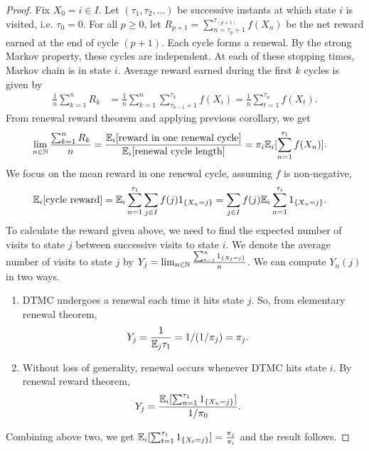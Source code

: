 \documentclass[a4paper,10pt,english]{article}
\begin{document}
\begin{proof}

Fix $X_0 = i \in I$. Let $(\tau_1, \tau_2, \ldots)$ be successive instants at which state $i$ is visited, i.e. $\tau_0 = 0$. 
For all $p \geq 0$,  let $R_{p+1} = \sum_{n = \tau_p + 1}^{\tau_{(p + 1)}} f(X_n)$ be the net reward earned at the end of cycle $(p+1)$. 
Each cycle forms a renewal. 
By the strong Markov property, these cycles are independent. 
At each of these stopping times, Markov chain is in state $i$. 
Average reward earned during the first $k$ cycles is given by
\begin{align*}	
\frac{1}{n} \sum_{k=1}^{n} R_k &= \frac{1}{n} \sum_{k=1}^{n} \sum_{\tau_{k-1} + 1}^{\tau_k} f(X_i)= \frac{1}{n} \sum_{t=1}^{\tau_n} f(X_t).
\end{align*}
From renewal reward theorem and applying previous corollary, we get
\begin{align*}
\lim_{n \in \mathbb{N}}\frac{\sum_{k=1}^nR_k}{n} &= \frac{\mathbb{E}_i[\text{reward in one renewal cycle}]}{\mathbb{E}_i[\text{renewal cycle length}]} = \pi_i\mathbb{E}_i[\sum_{n=1}^{\tau_1}f(X_n)].
\end{align*}
We focus on the mean reward in one renewal cycle, assuming $f$ is non-negative,
\begin{align*}
\mathbb{E}_i[\text{cycle reward}] &= \mathbb{E}_i\sum_{n=1}^{\tau_1} \sum_{j \in I} f(j) 1_{\{X_n = j\}} = \sum_{j \in I} f(j) \mathbb{E}_i\sum_{n=1}^{\tau_i} 1_{\{X_n = j\}}.
\end{align*}
To calculate the reward given above, we need to find the expected number of visits to state $j$ between successive visits to state $i$. 
We denote the average number of visits to state $j$ by  
$Y_j = \lim_{n \in \mathbb{N}}\frac{\sum_{t=1}^{n} 1_{\{X_t = j\}}}{n}$. %
We can compute $Y_n(j)$ in two ways.
\begin{enumerate}
	\item DTMC undergoes a renewal each time it hits state $j$. 
	So, from elementary renewal theorem, 
	\begin{align*}
	Y_j &= \frac{1}{\mathbb{E}_j\tau_1} = 1/(1/\pi_j) = \pi_j.
	\end{align*}
	\item Without loss of generality, renewal occurs whenever DTMC hits state $i$. 
	By renewal reward theorem, 
	\begin{align*}
	Y_j &= \frac{\mathbb{E}_i[\sum_{n=1}^{\tau_1} 1_{\{X_n = j\}}]}{1/\pi_0}.
	\end{align*}
\end{enumerate}
Combining above two, we get $\mathbb{E}_i[\sum_{t=1}^{\tau_1} 1_{\{X_t = j\}}] = \frac{\pi_j}{\pi_i}$ and the result follows. 

\end{proof}
\end{document}
